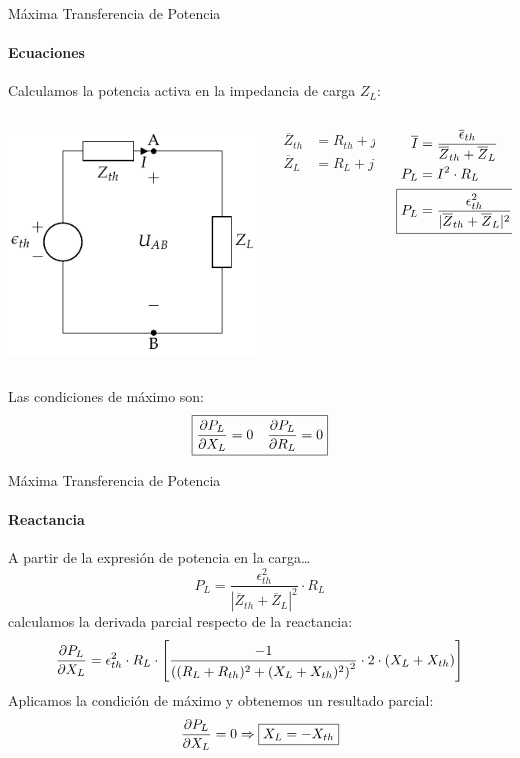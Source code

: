 \documentclass[aspectratio=169, usenames,svgnames,dvipsnames]{beamer}
\begin{document}
\begin{frame}[label={sec:orgc954ba1}]{Máxima Transferencia de Potencia}
\framesubtitle{Ecuaciones}
Calculamos la potencia activa en la impedancia de carga \(Z_L\):
\begin{columns}
\begin{column}{0.3\columnwidth}
\begin{center}
\includegraphics[height=0.45\textheight]{../figs/EquivalenteThevenin0.pdf}
\end{center}
\end{column}

\begin{column}{0.2\columnwidth}
\begin{align*}
  \overline{Z}_{th} &= R_{th} + jX_{th}\\
  \overline{Z}_L &= R_L + jX_L\\
\end{align*}
\end{column}

\begin{column}{0.4\columnwidth}
\begin{align*}
\overline{I} &= \frac{\overline{\epsilon}_{th}}{\overline{Z}_{th} + \overline{Z}_L}\\
P_L &= I^2 \cdot R_L\\
\Aboxed{P_L &= \frac{\epsilon^2_{th}}{|\overline{Z}_{th} + \overline{Z}_L|^2} \cdot R_L}
\end{align*}
\end{column}
\end{columns}

Las condiciones de máximo son: 
\[
  \boxed{%
    \diffp{P_L}{X_L} = 0 \quad%
    \diffp{P_L}{R_L} = 0%
  }
\]
\end{frame}

\begin{frame}[label={sec:orgbc55d63}]{Máxima Transferencia de Potencia}
\framesubtitle{Reactancia}
A partir de la expresión de potencia en la carga\ldots{}
\[
  P_L = \frac{\epsilon^2_{th}}{|\overline{Z}_{th} + \overline{Z}_L|^2} \cdot R_L
\]
calculamos la derivada parcial respecto de la reactancia:
\[
  \diffp{P_L}{X_L} = \epsilon^2_{th} \cdot R_L \cdot \left[\frac{-1}{\left((R_L + R_{th})^2 + (X_L + X_{th})^2\right)^2} \cdot 2 \cdot (X_L + X_{th})\right]
\]
Aplicamos la condición de máximo y obtenemos un resultado parcial:
\[
   \diffp{P_L}{X_L} = 0 \Rightarrow \boxed{X_L = - X_{th}}
\]
\end{frame}
\end{document}
